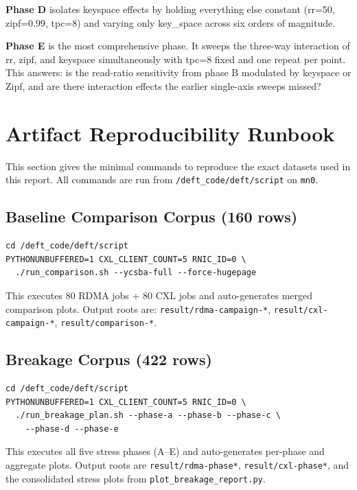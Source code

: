 \documentclass[10pt,twocolumn]{article}
\begin{document}
\textbf{Phase D} isolates keyspace effects by holding everything else
constant (rr=50, zipf=0.99, tpc=8) and varying only key\_space across
six orders of magnitude.

\textbf{Phase E} is the most comprehensive phase.
It sweeps the three-way interaction of rr, zipf, and keyspace simultaneously
with tpc=8 fixed and one repeat per point.
This answers: is the read-ratio sensitivity from phase B modulated by keyspace
or Zipf, and are there interaction effects the earlier single-axis sweeps missed?

\section{Artifact Reproducibility Runbook}
\label{sec:runbook}

This section gives the minimal commands to reproduce the exact datasets used in
this report.
All commands are run from \texttt{/deft\_code/deft/script} on \texttt{mn0}.

\subsection{Baseline Comparison Corpus (160 rows)}

\begin{lstlisting}
cd /deft_code/deft/script
PYTHONUNBUFFERED=1 CXL_CLIENT_COUNT=5 RNIC_ID=0 \
  ./run_comparison.sh --ycsba-full --force-hugepage
\end{lstlisting}

This executes 80 RDMA jobs + 80 CXL jobs and auto-generates merged comparison
plots.
Output roots are:
\texttt{result/rdma-campaign-*},
\texttt{result/cxl-campaign-*},
\texttt{result/comparison-*}.

\subsection{Breakage Corpus (422 rows)}

\begin{lstlisting}
cd /deft_code/deft/script
PYTHONUNBUFFERED=1 CXL_CLIENT_COUNT=5 RNIC_ID=0 \
  ./run_breakage_plan.sh --phase-a --phase-b --phase-c \
    --phase-d --phase-e
\end{lstlisting}

This executes all five stress phases (A--E) and auto-generates per-phase and
aggregate plots.
Output roots are \texttt{result/rdma-phase*}, \texttt{result/cxl-phase*}, and
the consolidated stress plots from \texttt{plot\_breakage\_report.py}.
\end{document}
